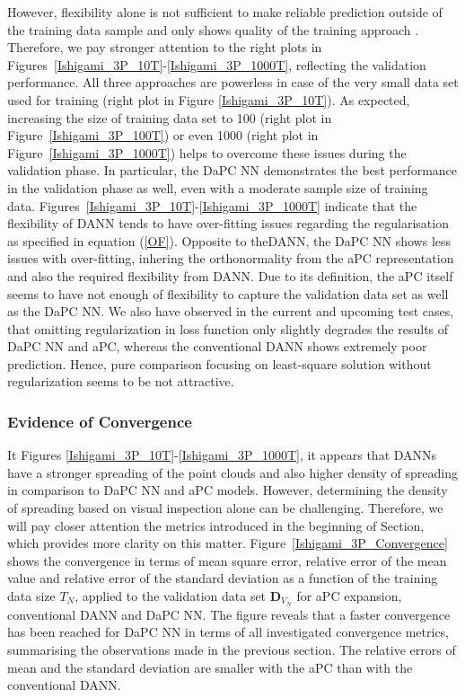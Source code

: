 \documentclass[a4paper,fleqn]{article}
\newcommand{\rw}[1]{\textcolor{blue}{#1}}
\newcommand{\del}[1]{\textcolor{red}{\sout{#1}}}
\renewcommand{\del}[1]{}
\renewcommand{\rw}[1]{#1}
\begin{document}
However, flexibility alone is not sufficient to make reliable prediction outside of the training data sample and \rw{only shows quality of the training approach} \del{hence, practically almost irrelevant}. Therefore, we pay stronger attention to the right plots in Figures~{\ref{Ishigami_3P_10T}-\ref{Ishigami_3P_1000T}}, reflecting the validation performance. All three approaches are powerless in case of the very small data set used for training (right plot in Figure \ref{Ishigami_3P_10T}). As expected, increasing the size of training data set to 100 (right plot in Figure~\ref{Ishigami_3P_100T}) or even 1000  (right plot in Figure~\ref{Ishigami_3P_1000T}) helps to overcome these issues during the validation phase. In particular, the DaPC NN demonstrates the best performance in the validation phase as well, even with a moderate sample size of training data.  Figures~\ref{Ishigami_3P_10T}-\ref{Ishigami_3P_1000T} indicate that the flexibility of DANN tends to have over-fitting issues regarding the regularisation as specified in equation (\ref{OF}). Opposite to theDANN, the DaPC NN shows less issues with over-fitting, inhering the orthonormality from the aPC representation and also the required flexibility from DANN. Due to its definition, the aPC itself seems to have not enough of flexibility to capture the validation data set as \del{good} \rw{well} as the DaPC NN. \rw{We also have observed in the current and upcoming test cases, that omitting regularization in loss function only slightly degrades the results of DaPC NN and aPC, whereas the conventional DANN shows extremely poor prediction. Hence, pure comparison focusing on least-square solution without regularization seems to be not attractive.}  

\subsubsection{Evidence of Convergence}

\rw{It Figures \ref{Ishigami_3P_10T}-\ref{Ishigami_3P_1000T}, it appears that DANNs have a stronger spreading of the point clouds and also higher density of spreading in comparison to DaPC NN and aPC models. However, determining the density of spreading based on visual inspection alone can be challenging. Therefore, we will pay closer attention the metrics introduced in the beginning of Section, which provides more clarity on this matter.}
Figure~\ref{Ishigami_3P_Convergence} shows the convergence in terms of mean square error, relative error of the mean value and relative error of the standard deviation as a function of the training data size $T_N$, applied to the validation data set $\bm{D}_{V_N}$ for aPC expansion, conventional DANN and DaPC NN. The figure reveals that a faster convergence has been reached for DaPC NN in terms of all investigated convergence metrics, summarising the observations made in the previous section. The relative errors of mean and the standard deviation are smaller with the aPC than with the conventional DANN.  
\end{document}
